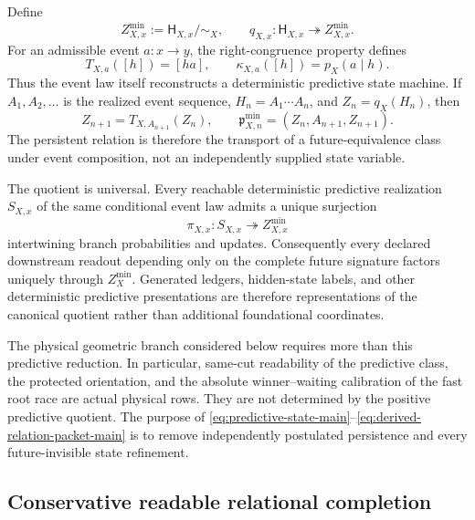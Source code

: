 \documentclass[11pt]{article}
\theoremstyle{definition}
\theoremstyle{remark}
\begin{document}
Define
\begin{equation}
 \boxed{
 Z_{X,x}^{\min}:=\mathsf H_{X,x}/\!\sim_X,
 \qquad q_{X,x}:\mathsf H_{X,x}\twoheadrightarrow Z_{X,x}^{\min}.}
 \label{eq:predictive-state-main}
\end{equation}
For an admissible event $a:x\to y$, the right-congruence property defines
\begin{equation}
 \boxed{
 T_{X,a}([h])=[ha],
 \qquad
 \kappa_{X,a}([h])=p_X(a\mid h).}
 \label{eq:predictive-update-main}
\end{equation}
Thus the event law itself reconstructs a deterministic predictive state
machine.  If $A_1,A_2,\ldots$ is the realized event sequence,
$H_n=A_1\cdots A_n$, and $Z_n=q_X(H_n)$, then
\begin{equation}
 \boxed{
 Z_{n+1}=T_{X,A_{n+1}}(Z_n),
 \qquad
 \mathfrak p_{X,n}^{\min}
   =(Z_n,A_{n+1},Z_{n+1}).}
 \label{eq:derived-relation-packet-main}
\end{equation}
The persistent relation is therefore the transport of a future-equivalence
class under event composition, not an independently supplied state variable.

The quotient is universal.  Every reachable deterministic predictive
realization $S_{X,x}$ of the same conditional event law admits a unique
surjection
\begin{equation}
 \pi_{X,x}:S_{X,x}\twoheadrightarrow Z_{X,x}^{\min}
 \label{eq:predictive-universal-main}
\end{equation}
intertwining branch probabilities and updates.  Consequently every declared
downstream readout depending only on the complete future signature factors
uniquely through $Z_X^{\min}$.  Generated ledgers, hidden-state labels, and
other deterministic predictive presentations are therefore representations of
the canonical quotient rather than additional foundational coordinates.

The physical geometric branch considered below requires more than this
predictive reduction.  In particular, same-cut readability of the predictive
class, the protected orientation, and the absolute winner--waiting calibration
of the fast root race are actual physical rows.  They are not determined by
the positive predictive quotient.  The purpose of
\eqref{eq:predictive-state-main}--\eqref{eq:derived-relation-packet-main} is to
remove independently postulated persistence and every future-invisible state
refinement.

\subsection{Conservative readable relational completion}
\end{document}
